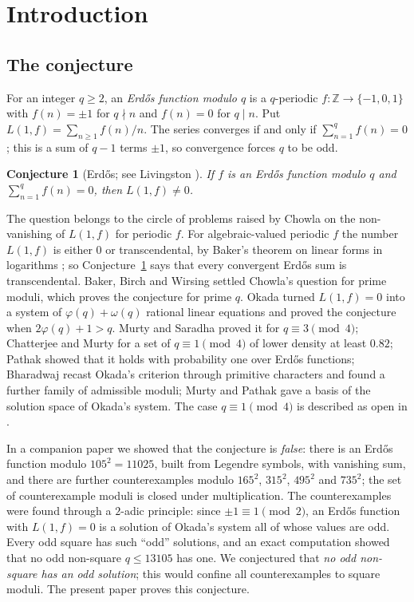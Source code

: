 \documentclass[11pt]{amsart}
\newtheorem{conjecture}[theorem]{Conjecture}
\theoremstyle{definition}
\theoremstyle{remark}
\providecommand{\Z}{\mathbb Z}
\numberwithin{equation}{section}
\begin{document}
\section{Introduction}\label{sec:intro}

\subsection{The conjecture}
For an integer $q\ge2$, an \emph{Erd\H{o}s function modulo $q$} is a $q$-periodic $f\colon\Z\to\{-1,0,1\}$ with $f(n)=\pm1$ for $q\nmid n$ and $f(n)=0$ for $q\mid n$.
Put $L(1,f)=\sum_{n\ge1}f(n)/n$.
The series converges if and only if $\sum_{n=1}^{q}f(n)=0$; this is a sum of $q-1$ terms $\pm1$, so convergence forces $q$ to be odd.

\begin{conjecture}[Erd\H{o}s; see Livingston \cite{Liv65}]\label{conj:erdos}
If $f$ is an Erd\H{o}s function modulo $q$ and $\sum_{n=1}^{q}f(n)=0$, then $L(1,f)\neq0$.
\end{conjecture}

The question belongs to the circle of problems raised by Chowla \cite{Cho70} on the non-vanishing of $L(1,f)$ for periodic $f$.
For algebraic-valued periodic $f$ the number $L(1,f)$ is either $0$ or transcendental, by Baker's theorem on linear forms in logarithms \cite{Bak75,BBW73,MS07}; so Conjecture~\ref{conj:erdos} says that every convergent Erd\H{o}s sum is transcendental.
Baker, Birch and Wirsing \cite{BBW73} settled Chowla's question for prime moduli, which proves the conjecture for prime $q$.
Okada \cite{Oka82} turned $L(1,f)=0$ into a system of $\varphi(q)+\omega(q)$ rational linear equations and proved the conjecture when $2\varphi(q)+1>q$.
Murty and Saradha \cite{MS10} proved it for $q\equiv3\pmod4$; Chatterjee and Murty \cite{CM15} for a set of $q\equiv1\pmod 4$ of lower density at least $0.82$; Pathak \cite{Pat19} showed that it holds with probability one over Erd\H{o}s functions; Bharadwaj \cite{Bha22} recast Okada's criterion through primitive characters and found a further family of admissible moduli; Murty and Pathak \cite{MP22} gave a basis of the solution space of Okada's system.
The case $q\equiv1\pmod 4$ is described as open in \cite{Pat19,MP22,Bha22}.

In a companion paper \cite{Kei26} we showed that the conjecture is \emph{false}: there is an Erd\H{o}s function modulo $105^2=11025$, built from Legendre symbols, with vanishing sum, and there are further counterexamples modulo $165^2$, $315^2$, $495^2$ and $735^2$; the set of counterexample moduli is closed under multiplication.
The counterexamples were found through a $2$-adic principle: since $\pm1\equiv1\pmod 2$, an Erd\H{o}s function with $L(1,f)=0$ is a solution of Okada's system all of whose values are odd.
Every odd square has such ``odd'' solutions, and an exact computation showed that no odd non-square $q\le13105$ has one.
We conjectured \cite[Conj.~5.3]{Kei26} that \emph{no odd non-square has an odd solution}; this would confine all counterexamples to square moduli.
The present paper proves this conjecture.
\end{document}
